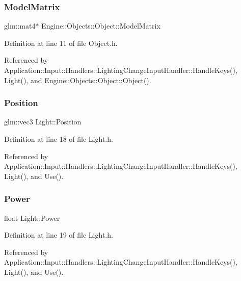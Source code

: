 \subsubsection{\texorpdfstring{Model\+Matrix}{ModelMatrix}}
{\footnotesize\ttfamily glm\+::mat4$\ast$ Engine\+::\+Objects\+::\+Object\+::\+Model\+Matrix\hspace{0.3cm}{\ttfamily [inherited]}}



Definition at line 11 of file Object.\+h.



Referenced by Application\+::\+Input\+::\+Handlers\+::\+Lighting\+Change\+Input\+Handler\+::\+Handle\+Keys(), Light(), and Engine\+::\+Objects\+::\+Object\+::\+Object().

\mbox{\label{classLight_ab6a04fde7b96f06ab935cd1d53b91e0b}} 
\subsubsection{\texorpdfstring{Position}{Position}}
{\footnotesize\ttfamily glm\+::vec3 Light\+::\+Position}



Definition at line 18 of file Light.\+h.



Referenced by Application\+::\+Input\+::\+Handlers\+::\+Lighting\+Change\+Input\+Handler\+::\+Handle\+Keys(), Light(), and Use().

\mbox{\label{classLight_a161f4944da390d9bc388091bafd59fe3}} 
\subsubsection{\texorpdfstring{Power}{Power}}
{\footnotesize\ttfamily float Light\+::\+Power}



Definition at line 19 of file Light.\+h.



Referenced by Application\+::\+Input\+::\+Handlers\+::\+Lighting\+Change\+Input\+Handler\+::\+Handle\+Keys(), Light(), and Use().

\mbox{\label{classEngine_1_1Components_1_1Objects_1_1VertexObject_a13ec6e4a92520bdd1b33ad6de757cb92}} 
